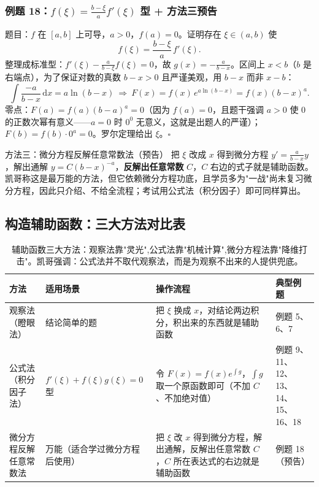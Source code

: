 \documentclass[a4paper]{article}
\begin{document}
\subsubsection{例题 18：$f(\xi)=\frac{b-\xi}{a}f'(\xi)$ 型 + 方法三预告}

题目：$f$ 在 $[a,b]$ 上可导，$a>0$，$f(a)=0$。证明存在 $\xi\in(a,b)$ 使
\[
f(\xi)=\frac{b-\xi}{a}\,f'(\xi).
\]
整理成标准型：$f'(\xi)-\frac{a}{b-\xi}f(\xi)=0$，故 $g(x)=-\frac{a}{b-x}$。区间上 $x<b$（$b$ 是右端点），为了保证对数的真数 $b-x>0$ 且严谨美观，用 $b-x$ 而非 $x-b$：
\[
\int\frac{-a}{b-x}\,\mathrm{d}x = a\ln(b-x)\ \Rightarrow\ F(x)=f(x)\,e^{a\ln(b-x)}=f(x)(b-x)^{a}.
\]
零点：$F(a)=f(a)(b-a)^a=0$（因为 $f(a)=0$，且题干强调 $a>0$ 使 $0$ 的正数次幂有意义——$a=0$ 时 $0^0$ 无意义，这就是出题人的严谨）；$F(b)=f(b)\cdot 0^a=0$。罗尔定理给出 $\xi$。$\square$

\begin{knowledgebox}{方法三：微分方程反解任意常数法（预告）}
把 $\xi$ 改成 $x$ 得到微分方程 $y'=\frac{a}{b-x}y$，解出通解 $y=C(b-x)^{-a}$，\textbf{反解出任意常数 }$C$，$C$ 右边的式子就是辅助函数。凯哥称这是最万能的方法，但它依赖微分方程功底，且学员多为"一战"尚未复习微分方程，因此只介绍、不给全流程；考试用公式法（积分因子）即可同样算出。
\end{knowledgebox}


\subsection{构造辅助函数：三大方法对比表}

\begin{table}[H]
\centering
\begin{tabular}{p{2.4cm}p{2.8cm}p{4.6cm}p{4.6cm}}
\toprule
\textbf{方法} & \textbf{适用场景} & \textbf{操作流程} & \textbf{典型例题} \\
\midrule
观察法（瞪眼法） & 结论简单的题 & 把 $\xi$ 换成 $x$，对结论两边积分，积出来的东西就是辅助函数 & 例题 5、6、7 \\
公式法（积分因子法） & $f'(\xi)+f(\xi)g(\xi)=0$ 型 & 令 $F(x)=f(x)e^{\int g}$，$\int g$ 取一个原函数即可（不加 $C$、不加绝对值） & 例题 9、11、12、13、14、15、16、18 \\
微分方程反解任意常数法 & 万能（适合学过微分方程后使用） & 把 $\xi$ 改 $x$ 得到微分方程，解出通解，反解出任意常数 $C$，$C$ 所在表达式的右边就是辅助函数 & 例题 18（预告） \\
\bottomrule
\end{tabular}
\caption{辅助函数三大方法：观察法靠"灵光",公式法靠"机械计算",微分方程法靠"降维打击"。凯哥强调：公式法并不取代观察法，而是为观察不出来的人提供兜底。}
\end{table}
\end{document}
